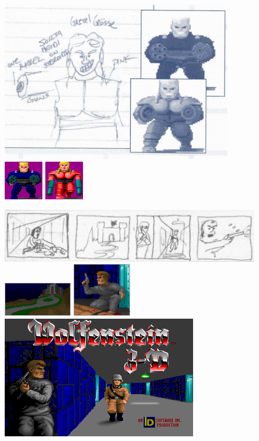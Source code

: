 \documentclass[book.tex]{subfiles}
\begin{document}
   \begin{figure}[H]
\centering
 \includegraphics[scale=0.8]{imgs/tom_hall_sketch_gretel.png}\\
 \includegraphics[scale=2.5]{imgs/sprites/hans_grosse.png}
 \includegraphics[scale=5]{imgs/sprites/gretel_hanse.png}
 \end{figure}
 
   \begin{figure}[H]
\centering
 \includegraphics[scale=0.5]{imgs/tom_hall_sketch_intro_screen_genesis.png}
 \includegraphics[scale=3]{imgs/sprites/castle.png}
 \includegraphics[scale=5]{imgs/sprites/jim.png}
 \includegraphics[scale=3]{imgs/sprites/woldf3d.png}
 \end{figure}
 
\end{document}
